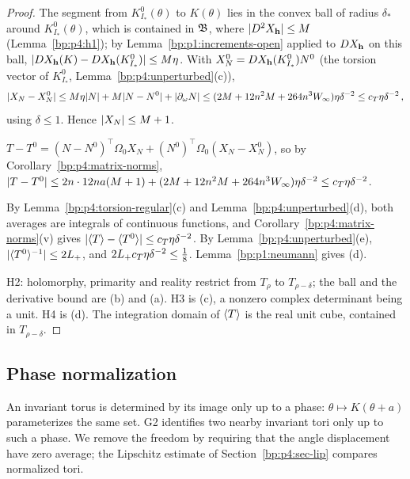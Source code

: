 \begin{proof}
\label{step:p4:stab-xn}
The segment from $K^0_{I_*}(\theta)$ to $K(\theta)$ lies in the convex ball of radius $\delta_*$
around $K^0_{I_*}(\theta)$, which is contained in $\mathfrak{B}$, where $\lvert D^2X_{\mathbf{h}}\rvert\le M$
(Lemma~\ref{bp:p4:h1}); by Lemma~\ref{bp:p1:increments-open} applied to $DX_{\mathbf{h}}$ on this ball,
$\lvert DX_{\mathbf{h}}(K)-DX_{\mathbf{h}}(K^0_{I_*})\rvert\le M\eta$. With $X_N^0=DX_{\mathbf{h}}(K^0_{I_*})N^0$ (the torsion
vector of $K^0_{I_*}$, Lemma~\ref{bp:p4:unperturbed}(c)),
\begin{equation*}
\lvert X_N-X_N^0\rvert\le M\eta\lvert N\rvert+M\lvert N-N^0\rvert+\lvert \partial_\omega N\rvert\le(2M+12n^2M+264n^3W_\infty)\eta\delta^{-2}\le c_T\eta\delta^{-2}\,,
\end{equation*}
using $\delta\le1$. Hence $\lvert X_N\rvert\le M+1$.

\label{step:p4:stab-torsion}
$T-T^0=(N-N^0)^\top\Omega_0X_N+(N^0)^\top\Omega_0(X_N-X_N^0)$, so by
Corollary~\ref{bp:p4:matrix-norms},
$\lvert T-T^0\rvert\le2n\cdot12na(M+1)+(2M+12n^2M+264n^3W_\infty)\eta\delta^{-2}\le c_T\eta\delta^{-2}$.

\label{step:p4:stab-twist}
By Lemma~\ref{bp:p4:torsion-regular}(c) and Lemma~\ref{bp:p4:unperturbed}(d), both averages are
integrals of continuous functions, and Corollary~\ref{bp:p4:matrix-norms}(v) gives
$\lvert \langle T\rangle-\langle T^0\rangle\rvert\le c_T\eta\delta^{-2}$. By Lemma~\ref{bp:p4:unperturbed}(e),
$\lvert \langle T^0\rangle^{-1}\rvert\le2L_{+}$, and $2L_{+} c_T\eta\delta^{-2}\le\frac18$. Lemma~\ref{bp:p1:neumann}
gives (d).

\label{step:p4:stab-h2h4}
H2: holomorphy, primarity and reality restrict from $T_\rho$ to $T_{\rho-\delta}$; the ball and
the derivative bound are (b) and (a). H3 is (c), a nonzero complex determinant being a unit. H4
is (d). The integration domain of $\langle T\rangle$ is the real unit cube, contained in $T_{\rho-\delta}$.
\end{proof}

\subsection{Phase normalization}\label{bp:p4:sec-normal}

An invariant torus is determined by its image only up to a phase: $\theta\mapsto K(\theta+a)$
parameterizes the same set. G2 identifies two nearby invariant tori only up to such a phase. We
remove the freedom by requiring that the angle displacement have zero average; the Lipschitz
estimate of Section~\ref{bp:p4:sec-lip} compares normalized tori.

